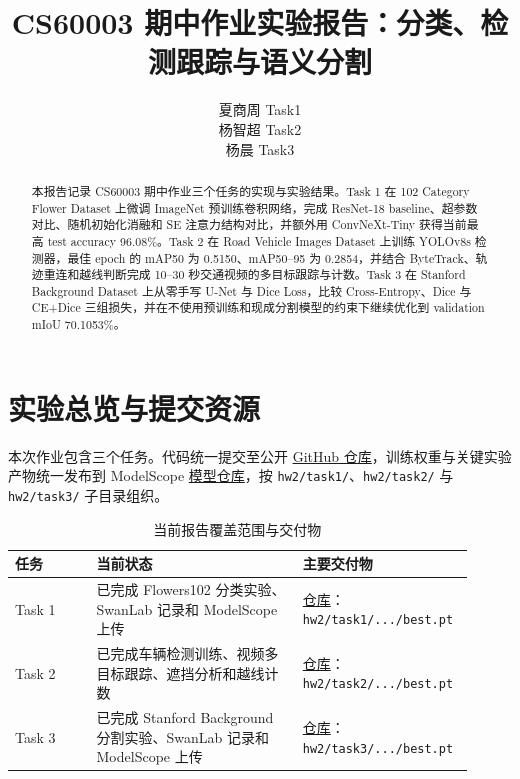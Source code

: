 \documentclass[lang=cn,a4paper,newtx,code=minted]{elegantpaper}
\title{CS60003 期中作业实验报告：分类、检测跟踪与语义分割}
\author{夏商周 \quad 25210980114 \quad Task1 \\ 杨智超 \quad 25210980124 \quad Task2 \\ 杨晨 \quad 25210980120 \quad Task3}
\institute{\href{https://github.com/YangChen-pro/CS60003}{代码仓库}\quad|\quad\href{https://modelscope.cn/models/youngchen/CS60003/}{模型仓库}}
\date{\zhdate{2026/05/17}}
\begin{document}
\maketitle

\begin{abstract}
本报告记录 CS60003 期中作业三个任务的实现与实验结果。Task 1 在 102 Category Flower Dataset 上微调 ImageNet 预训练卷积网络，完成 ResNet-18 baseline、超参数对比、随机初始化消融和 SE 注意力结构对比，并额外用 ConvNeXt-Tiny 获得当前最高 test accuracy 96.08\%。Task 2 在 Road Vehicle Images Dataset 上训练 YOLOv8s 检测器，最佳 epoch 的 mAP50 为 0.5150、mAP50--95 为 0.2854，并结合 ByteTrack、轨迹重连和越线判断完成 10--30 秒交通视频的多目标跟踪与计数。Task 3 在 Stanford Background Dataset 上从零手写 U-Net 与 Dice Loss，比较 Cross-Entropy、Dice 与 CE+Dice 三组损失，并在不使用预训练和现成分割模型的约束下继续优化到 validation mIoU 70.1053\%。
\end{abstract}

\section{实验总览与提交资源}

本次作业包含三个任务。代码统一提交至公开 \href{https://github.com/YangChen-pro/CS60003/tree/main/hw2}{GitHub 仓库}，训练权重与关键实验产物统一发布到 ModelScope \href{https://www.modelscope.cn/models/youngchen/CS60003/tree/master/hw2}{模型仓库}，按 \texttt{hw2/task1/}、\texttt{hw2/task2/} 与 \texttt{hw2/task3/} 子目录组织。

\begin{table}[!htbp]
\centering
\small
\caption{当前报告覆盖范围与交付物}
\label{tab:overview}
\begin{tabular}{@{}L{0.17\linewidth}L{0.43\linewidth}L{0.31\linewidth}@{}}
\toprule
任务 & 当前状态 & 主要交付物 \\
\midrule
Task 1 & 已完成 Flowers102 分类实验、SwanLab 记录和 ModelScope 上传 & \href{https://www.modelscope.cn/models/youngchen/CS60003/tree/master/hw2/task1}{仓库}：\texttt{hw2/task1/.../best.pt} \\
Task 2 & 已完成车辆检测训练、视频多目标跟踪、遮挡分析和越线计数 & \href{https://www.modelscope.cn/models/youngchen/CS60003/tree/master/hw2/task2}{仓库}：\texttt{hw2/task2/.../best.pt} \\
Task 3 & 已完成 Stanford Background 分割实验、SwanLab 记录和 ModelScope 上传 & \href{https://www.modelscope.cn/models/youngchen/CS60003/tree/master/hw2/task3}{仓库}：\texttt{hw2/task3/.../best.pt} \\
\bottomrule
\end{tabular}
\end{table}
\end{document}
